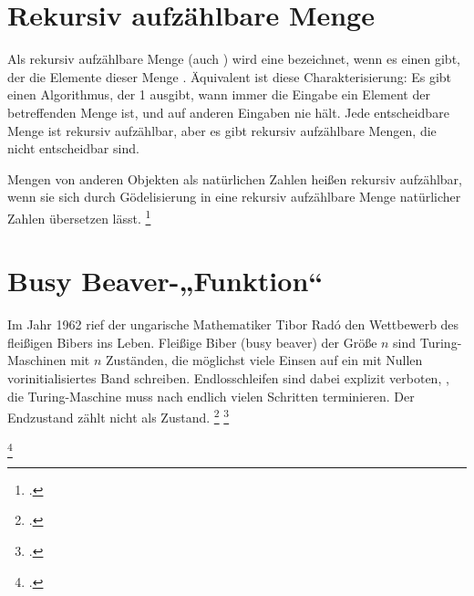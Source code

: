 \documentclass{lehramt-informatik-haupt}
\begin{document}
\section{Rekursiv aufzählbare Menge}

Als rekursiv aufzählbare Menge (auch )
wird eine  bezeichnet, wenn es einen
 gibt, der die Elemente dieser Menge
. Äquivalent ist diese Charakterisierung: Es gibt einen
Algorithmus, der 1 ausgibt, wann immer die Eingabe ein Element der
betreffenden Menge ist, und auf anderen Eingaben nie hält. Jede
entscheidbare Menge ist rekursiv aufzählbar, aber es gibt rekursiv
aufzählbare Mengen, die nicht entscheidbar sind.

Mengen von anderen Objekten als natürlichen Zahlen heißen rekursiv
aufzählbar, wenn sie sich durch Gödelisierung in eine rekursiv
aufzählbare Menge natürlicher Zahlen übersetzen lässt.
\footcite{wiki:rekursiv-aufzaehlbar}

%

\section{Busy Beaver-„Funktion“}

Im Jahr 1962 rief der ungarische Mathematiker Tibor Radó den Wettbewerb
des ﬂeißigen Bibers ins Leben. Fleißige Biber (busy beaver) der Größe
$n$ sind Turing-Maschinen mit $n$ Zuständen, die möglichst viele Einsen
auf ein mit Nullen vorinitialisiertes Band schreiben. Endlosschleifen
sind dabei explizit verboten, \dh, die Turing-Maschine muss nach endlich
vielen Schritten terminieren. Der Endzustand zählt nicht als Zustand.
\footcite[Seite 337]{hoffmann}
\footcite{wiki:busy-beaver}

\footcite[Seite 26]{theo:fs:4}
\literatur
\end{document}
